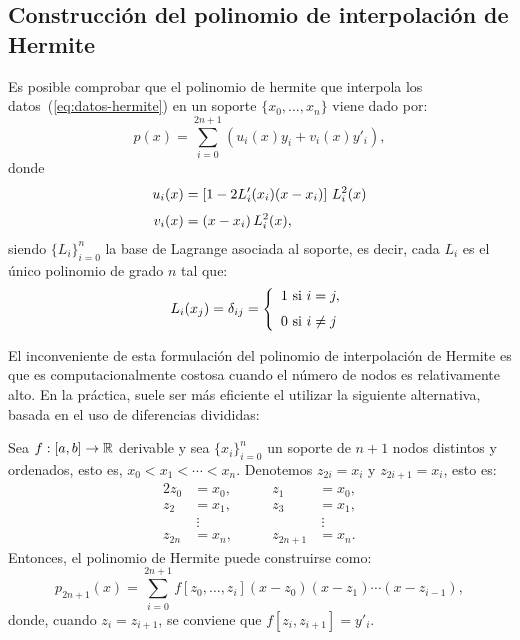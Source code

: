 \subsection*{Construcción del polinomio de interpolación de Hermite}
\label{sec:constr-del-polin-hermite}

Es posible comprobar que el polinomio de hermite que interpola los
datos~(\ref{eq:datos-hermite}) en un soporte $\{x_0,\dots,x_n\}$
viene dado por:
\begin{equation*}
  p(x)=\sum_{i=0}^{2n+1}(u_i(x)y_i+ v_i(x)y'_i),
\end{equation*}
donde
\begin{align*}
  u_i(x)&=\left[1-2L'_i(x_i)(x-x_i)\right]\, L_i^2(x)
  \\ \noalign{\smallskip}
  v_i(x)&=(x-x_i)\, L_i^2(x),
\end{align*}
siendo $\{L_i\}_{i=0}^n$ la base de Lagrange asociada al soporte,
es decir, cada $L_i$ es el único polinomio de grado $n$ tal que:
\begin{equation}
  L_i(x_j)= \delta_{ij} = 
  \left\{\begin{array}{l}
      1 \text{ si } i=j, \\\noalign{\medskip} 0 \text{ si } i\neq j
    \end{array}\right.
\end{equation}

El inconveniente de esta formulación del polinomio de interpolación de
Hermite es que es computacionalmente costosa cuando el número de nodos
es relativamente alto. En la práctica, suele ser más eficiente el
utilizar la siguiente alternativa, basada en el uso de diferencias
divididas:


\begin{theorem}
  \label{thm:formula-newton-hermite}
  Sea $f:[a,b]\to\operatorname{{\mathbb R}}$ derivable y sea $\{x_i\}_{i=0}^n$ un soporte
  de $n+1$ nodos distintos y ordenados, esto es,
  $x_0<x_1<\cdots<x_n$. Denotemos $z_{2i}=x_i$ y $z_{2i+1}=x_i$, esto es:
  \begin{alignat*}{2} %
    z_0&=x_0, & z_1&=x_0,\\ 
    z_2&=x_1, & z_3&=x_1,\\ 
    &\ \vdots & &\ \vdots \\
    z_{2n}&=x_n, \qquad & z_{2n+1}&=x_n.
  \end{alignat*}
  Entonces, el polinomio de Hermite puede construirse como:
  \begin{equation*}
    p_{2n+1}(x)=\sum_{i=0}^{2n+1}f[z_0,\dots,z_i]
    (x-z_0)(x-z_1)\cdots(x-z_{i-1}), 
  \end{equation*}
  donde, cuando $z_i=z_{i+1}$, se conviene que $f[z_i,z_{i+1}]=y'_i$.
\end{theorem}

